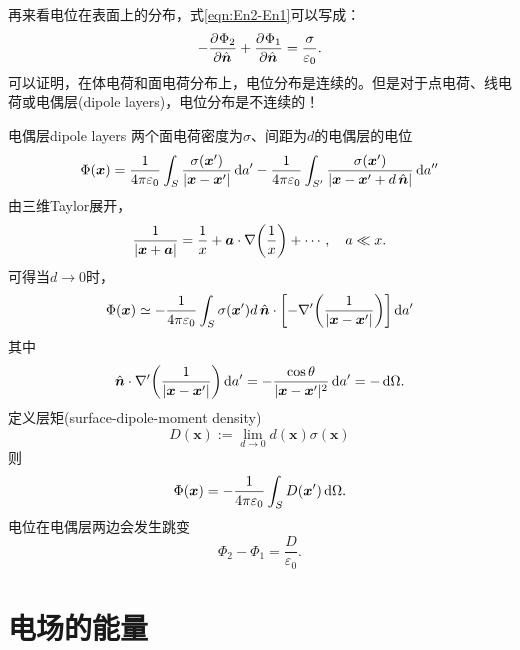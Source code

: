 再来看电位在表面上的分布，式\eqref{eqn:En2-En1}可以写成：
\begin{equation}
    -\frac{\partial^{{}}\Phi_2}{\partial{\mathop{}\!\hat{\bm{n}}}^{{}}}+\frac{\partial^{{}}\Phi_1}{\partial{\mathop{}\!\hat{\bm{n}}}^{{}}}=\frac\sigma{\varepsilon_0}.
\end{equation}
可以证明，在体电荷和面电荷分布上，电位分布是连续的。但是对于点电荷、线电荷或电偶层(dipole layers)，电位分布是不连续的！
\begin{example}{电偶层}{dipole layers}
    两个面电荷密度为$\sigma$、间距为$d$的电偶层的电位 
    \begin{align*}
        \Phi(\bm x)=\frac1{4\pi\varepsilon_0}\int_S\frac{\sigma(\bm x')}{|\bm x-\bm x'|}\mathop{}\!\mathrm{d} a'-\frac1{4\pi\varepsilon_0}\int_{S'}\frac{\sigma(\bm x')}{|\bm x-\bm x'+d\mathop{}\!\hat{\bm{n}}|}\mathop{}\!\mathrm{d} a''
    \end{align*}
    由三维Taylor展开，
    \[
        \frac1{|\bm x+\bm a|}=\frac1x+\bm a\cdot\nabla\biggl(\frac1x\biggr)+\cdots,\quad a\ll x.
    \]
    可得当$d\to0$时，
    \[
        \Phi(\bm x)\simeq-\frac1{4\pi\varepsilon_0}\int_S\sigma(\bm x')d\mathop{}\!\hat{\bm{n}}\cdot\biggl[-\nabla'\biggl(\frac1{|\bm x-\bm x'|}\biggr)\biggr]\mathop{}\!\mathrm{d} a'
    \]
    其中
    \[
        \mathop{}\!\hat{\bm{n}}\cdot\nabla'\biggl(\frac1{|\bm x-\bm x'|}\biggr)\mathop{}\!\mathrm{d} a'=-\frac{\cos\theta}{|\bm x-\bm x'|^2}\mathop{}\!\mathrm{d} a'=-\mathop{}\!\mathrm{d}\Omega.
    \]
    定义层矩(surface-dipole-moment density) 
    \[
        D(\bm x):=\lim_{d\to 0}d(\bm x)\sigma(\bm x)
    \]
    则
    \begin{equation}
        \Phi(\bm x)=-\frac1{4\pi\varepsilon_0}\int_SD(\bm x')\mathop{}\!\mathrm{d}\Omega.
    \end{equation}
    电位在电偶层两边会发生跳变
    \begin{equation}
        \Phi_2-\Phi_1=\frac D{\varepsilon_0}.
    \end{equation}
\end{example}

\section{电场的能量}

